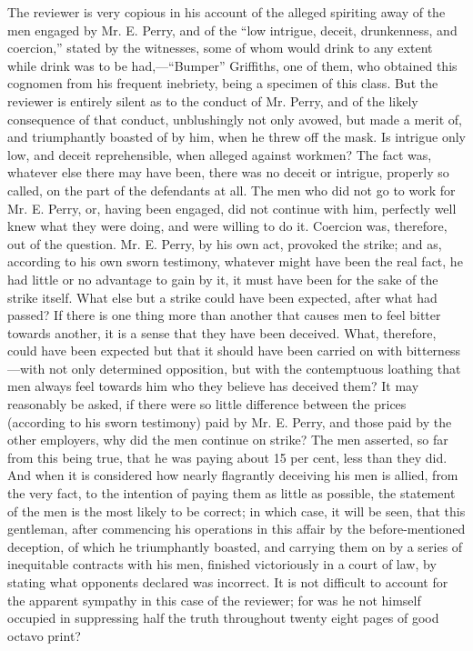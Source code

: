 The reviewer is very copious in his account of the alleged spiriting
away of the men engaged by Mr. E. Perry, and of the ``low intrigue,
deceit, drunkenness, and coercion,'' stated by the witnesses, some of
whom would drink to any extent while drink was to be had,---``Bumper''
Griffiths, one of them, who obtained this cognomen from his frequent
inebriety, being a specimen of this class. But the reviewer is entirely
silent as to the conduct of Mr. Perry, and of the likely consequence of
that conduct, unblushingly not only avowed, but made a merit of, and
triumphantly boasted of by him, when he threw off the mask. Is intrigue
only low, and deceit reprehensible, when alleged against workmen? The
fact was, whatever else there may have been, there was no deceit or
intrigue, properly so called, on the part of the defendants at all. The
men who did not go to work for Mr. E. Perry, or, having been engaged,
did not continue with him, perfectly well knew what they were doing, and
were willing to do it. Coercion was, therefore, out of the question. Mr.
E. Perry, by his own act, provoked the strike; and as, according to his
own sworn testimony, whatever might have been the real fact, he had
little or no advantage to gain by it, it must have been for the sake of
the strike itself. What else but a strike could have been expected,
after what had passed? If there is one thing more than another that
causes men to feel bitter towards another, it is a sense that they have
been deceived. What, therefore, could have been expected but that it
should have been carried on with bitterness---with not only determined
opposition, but with the contemptuous loathing that men always feel
towards him who they believe has deceived them? It may reasonably be
asked, if there were so little difference between the prices (according
to his sworn testimony) paid by Mr. E. Perry, and those paid by the
other employers, why did the men continue on strike? The men asserted,
so far from this being true, that he was paying about 15 per cent, less
than they did. And when it is considered how nearly flagrantly deceiving
his men is allied, from the very fact, to the intention of paying them
as little as possible, the statement of the men is the most likely to be
correct; in which case, it will be seen, that this gentleman, after
commencing his operations in this affair by the before-mentioned
deception, of which he triumphantly boasted, and carrying them on by a
series of inequitable contracts with his men, finished victoriously in a
court of law, by stating what opponents declared was incorrect. It is
not difficult to account for the apparent sympathy in this case of the
reviewer; for was he not himself occupied in suppressing half the truth
throughout twenty eight pages of good octavo print?

